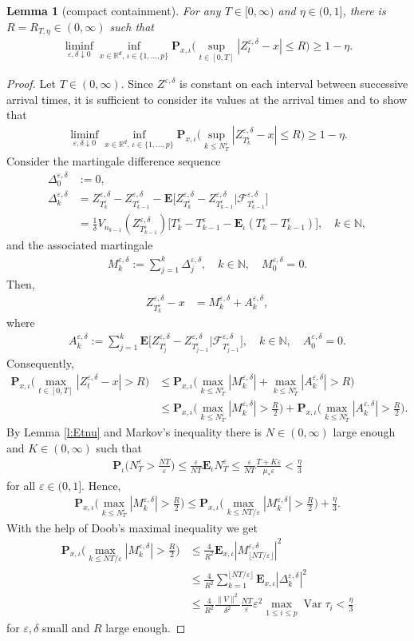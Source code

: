 \documentclass[10pt]{article}
\newcommand{\E}{\mathbf{E}}
\renewcommand{\P}{\mathbf{P}}
\newcommand{\1}{1\!\!\!\;{\rm I}}
\theoremstyle{plain}
\newtheorem{lem}[thm]{Lemma}
\theoremstyle{definition}
\newcommand{\e}{\varepsilon}
\newcommand{\ba}{\begin{equation}\begin{aligned}}
\newcommand{\ea}{\end{aligned}\end{equation}}
\DeclareMathOperator{\Var}{Var}
\newcommand{\rF}{\mathscr{F}}
\newcommand{\bR}{\mathbb{R}}
\numberwithin{equation}{section}
\begin{document}
\begin{lem}[compact containment]
\label{l:cc}
For any $T\in[0,\infty)$ and $\eta\in (0,1]$, there is
$R=R_{T,\eta}\in(0,\infty)$ such that
\ba
\liminf_{\e,\delta\downarrow 0} \inf_{x\in\bR^d,\, \iota\in\{1,\dots,p\}}
\P_{x,\iota}\Big(\sup_{t\in[0,T]}|Z^{\e,\delta}_t-x|\leq  R\Big) \geq  1 -\eta.
\ea
\end{lem}
\begin{proof}
Let $T\in(0,\infty)$.
Since $Z^{\e,\delta}$ is constant on each interval between successive
arrival times, it is sufficient to consider its values at the arrival times and
to show that
\ba
\liminf_{\e,\delta\downarrow 0}
 \inf_{x\in\bR^d,\, \iota\in\{1,\dots,p\}}
\P_{x,\iota}\Big(\sup_{k\leq N^\e_T }|Z^{\e,\delta}_{T_k^\e}-x|\leq  R\Big) \geq  1 -\eta.
\ea
Consider the martingale difference sequence
\ba
\Delta_0^{\e,\delta}&:=0,\\
\Delta_{k}^{\e,\delta}& = Z^{\e,\delta}_{T_{k}^\e}- Z^{\e,\delta}_{T_{k-1}^\e}
- \E \Big[ Z^{\e,\delta}_{T^\e_{k}}- Z^{\e,\delta}_{T^\e_{k-1}}\Big|\rF^{\e,\delta}_{T^\e_{k-1}}  \Big]\\
&=\frac{1}{\delta}V_{n_{k-1}}(Z^{\e,\delta}_{T^\e_{k-1}})  \Big[ T^\e_{k}- T^\e_{k-1}- \E_\iota  (T^\e_{k}-T^\e_{k-1})\Big],
\quad k\in\mathbb N,
\ea
and the associated martingale
\ba
M_k^{\e,\delta}:=\sum_{j=1}^k \Delta^{\e,\delta}_{j}, \quad k\in\mathbb N, \quad M_0^{\e,\delta}=0.
\ea
Then,
\ba
Z^{\e,\delta}_{T^\e_k}-x
&=M_k^{\e,\delta} + A_k^{\e,\delta},
\ea
where
\ba
A_k^{\e,\delta}:=\sum_{j=1}^k \E \Big[ Z^{\e,\delta}_{T^\e_j}- Z^{\e,\delta}_{T^\e_{j-1}}\Big|\rF^{\e,\delta}_{T^\e_{j-1}}  \Big],
\quad k\in\mathbb N,
\quad A_0^{\e,\delta}=0.
\ea
Consequently,
\ba
\label{e:e1}
\P_{x,\iota}\Big(\max_{t\in[0,T]}|Z^{\e,\delta}_t-x|> R\Big)
&\leq \P_{x,\iota}\Big(\max_{k\leq N^\e_T }|M_k^{\e,\delta}|+\max_{k\leq N^\e_T }|A_k^{\e,\delta}|> R\Big)\\
&\leq \P_{x,\iota}\Big(\max_{k\leq N^\e_T }|M_k^{\e,\delta}|>\frac{R}{2}\Big)
+\P_{x,\iota}\Big(\max_{k\leq N^\e_T }|A_k^{\e,\delta}|> \frac{R}{2}\Big).
\ea
By Lemma \ref{l:Etnu} and Markov's inequality there is $N\in (0,\infty)$ large enough and $K\in (0,\infty)$ such that
\ba
\label{e:NT}
\P_\iota\Big(N_T^\e> \frac{N T}{\e} \Big)
\leq \frac{\e}{NT} \E_\iota N_T^\e
\leq \frac{\e}{NT}\frac{T+K\e}{\mu_*\e}
<\frac{\eta}{3}
\ea
for all $\e\in(0,1]$.
Hence,
\ba
\P_{x,\iota}\Big(\max_{k\leq N^\e_T }|M_k^{\e,\delta}|>\frac{R}{2}\Big)
\leq \P_{x,\iota}\Big(\max_{k\leq NT/\e}|M_k^{\e,\delta}|>\frac{R}{2}\Big)
+ \frac{\eta}{3}.
\ea
With the help of Doob's maximal inequality we get
\ba
\label{e:e2}
 \P_{x,\iota}\Big( \max_{k\leq  NT/\e} |M^{\e,\delta}_k|> \frac{R}{2}\Big)
&\leq \frac{4}{R^2}\E_{x,\iota} |M^{\e,\delta}_{\lfloor NT/\e\rfloor}|^2\\
&\leq  \frac{4}{R^2}\sum_{k=1}^{\lfloor NT/\e\rfloor}\E_{x,\iota} |\Delta^{\e,\delta}_k|^2\\
&\leq \frac{4}{R^2} \frac{\|V\|^2}{\delta^2}\frac{NT}{\e}\e^2 \max_{1\leq i\leq p} \Var\tau_i
<\frac{\eta}{3}
\ea
for $\e,\delta$ small and $R$ large enough.


\end{proof}
\end{document}
